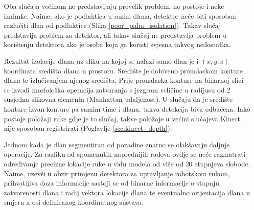 \documentclass[times, utf8, diplomski, numeric]{fer}
\begin{document}
Oba slučaja većinom ne predstavljaju prevelik problem, no postoje i neke iznimke. Naime, ako je podlaktica u razini dlana, detektor neće biti sposoban razlučiti dlan od podlaktice (Slika \ref{poor_palm_isolation}). Takav slučaj predstavlja problem za detektor, ali takav slučaj ne predstavlja problem u korištenju detektora ako je osoba koja ga koristi svjesna takvog nedostatka.

Rezultat izolacije dlana uz sliku na kojoj se nalazi samo dlan je i $(x,y,z)$ koordinata središta dlana u prostoru. Središte je dobiveno pronalaskom konture dlana te izlučivanjem njenog središta. Prije pronalaska konture na binarnoj slici se izvodi morfološka operacija zatvaranja s jezgrom veličine u radijusu od 2 susjedna slikovna elementa (Manhattan udaljenost). U slučaju da je središte konture izvan konture pa samim time i dlana, takva detekcija biva odbačena. Iako postoje položaji ruke gdje je to slučaj, takve položaje u većini slučajeva Kinect nije sposoban registrirati (Poglavlje \ref{sec:kinect_depth}).

Jednom kada je dlan segmentiran od pozadine znatno se olakšavaju daljnje operacije. Za razliku od spomenutih naprednijih radova ovdje se neće razmatrati određivanje precizne lokacije ruke u vidu modela od više od 20 stupnjeva slobode. Naime, uzevši u obzir primjenu detektora za upravljanje robotskom rukom, prihvatljiva doza informacije sastoji se od binarne informacije o stupnju zatvorenosti dlana i radij vektora lokacije dlana te eventualno orijentacija dlana u smjeru x-osi definiranog koordinatnog sustava.
\end{document}
